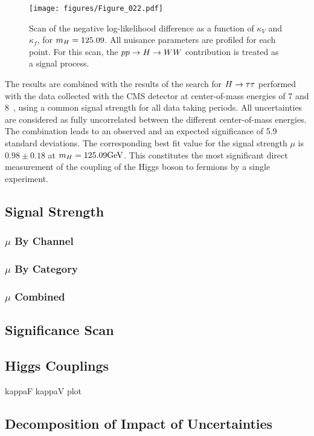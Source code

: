 \begin{figure}[!ht]
  \centering
    \texttt{[image: figures/Figure\_022.pdf]}
   \caption{Scan of the negative log-likelihood difference as a function of $\kappa_V$ and $\kappa_f$, for $m_{H} = 125.09$\GeV.  All nuisance parameters are profiled for each point. For this scan, the $pp\to H\to WW$ contribution is treated as a signal process.}
    \label{fig:kVkf}

\end{figure}

The results are combined with the results of the search for $H\to\tau\tau$ performed with the data collected with the CMS detector at center-of-mass energies of 7 and 8\TeV~\cite{Khachatryan:2014jba}, using a common signal strength for all data taking periods. All uncertainties are considered as fully uncorrelated between the different center-of-mass energies. The combination leads to an observed and an expected significance of 5.9 standard deviations. The corresponding best fit value for the signal strength $\mu$ is $0.98\pm 0.18$ at $m_{H} = 125.09\mathrm{GeV}$. This constitutes the most significant direct measurement of the coupling of the Higgs boson to fermions by a single experiment.

\subsection{Signal Strength}
\subsubsection{$\mu$ By Channel}
\subsubsection{$\mu$ By Category}
\subsubsection{$\mu$ Combined}
\subsection{Significance Scan}
\subsection{Higgs Couplings}
kappaF kappaV plot
\subsection{Decomposition of Impact of Uncertainties}

